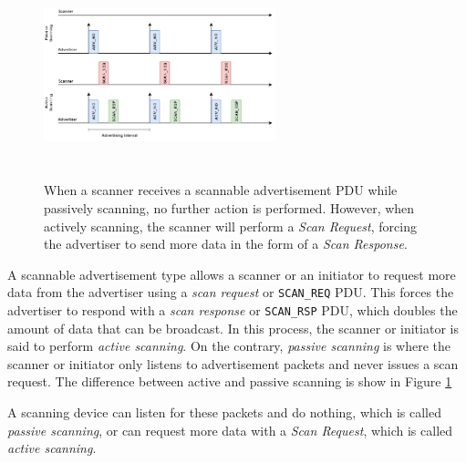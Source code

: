\begin{figure}[]
    \centering
    \includegraphics[width=0.6\textwidth,height=6cm,keepaspectratio=true]{images/scanning_modes/scanning_modes.drawio.png}
    \caption{When a scanner receives a scannable advertisement PDU while passively scanning, no further action is performed. However, when actively scanning, the scanner will perform a \textit{Scan Request}, forcing the advertiser to send more data in the form of a \textit{Scan Response}.}
    \label{fig:scan_modes}
\end{figure}
A scannable advertisement type allows a scanner or an initiator to request more data from the advertiser using a \textit{scan request} or \texttt{SCAN\_REQ} PDU. This forces the advertiser to respond with a \textit{scan response} or \texttt{SCAN\_RSP} PDU, which doubles the amount of data that can be broadcast. In this process, the scanner or initiator is said to perform \textit{active scanning}. On the contrary, \textit{passive scanning} is where the scanner or initiator only listens to advertisement packets and never issues a scan request. The difference between active and passive scanning is show in Figure \ref{fig:scan_modes}

A scanning device can listen for these packets and do nothing, which is called \textit{passive scanning}, or can request more data with a \textit{Scan Request}, which is called \textit{active scanning}. 

\newcommand{\bitlabel}[2]{%
    \bitbox[]{#1}{%
        \raisebox{0pt}[4ex][0pt]{%
            \turnbox{45}{\fontsize{7}{7}\selectfont#2}%
        }%
    }%
}
\newcommand{\textlabel}[2]{%
    \bitbox[]{#1}{\fontsize{7}{7}\selectfont#2}%
}

